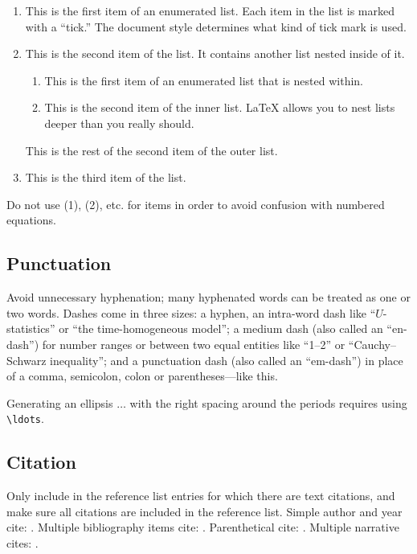 \documentclass[qe,nameyear,final,supplement,openaccess]{econsocart}
\theoremstyle{plain}
\begin{document}
\begin{enumerate}
\item This is the first item of an enumerated list. Each item in the list is marked with a ``tick.'' The document style determines what kind of tick mark is used.
\item This is the second item of the list. It contains another list nested inside of it.

\begin{enumerate}
\item This is the first item of an enumerated list that is nested within.
\item This is the second item of the inner list. LaTeX allows you to nest lists deeper than you really should.
\end{enumerate}

This is the rest of the second item of the outer list.


\item This is the third item of the list.
\end{enumerate}

Do not use (1), (2), etc.  for items in order to avoid confusion with numbered equations.

\subsection{Punctuation}

Avoid unnecessary hyphenation; many hyphenated words can be treated as one or two words.
Dashes come in three sizes: a hyphen, an intra-word dash like ``$U$-statistics'' or ``the time-homogeneous model'';
a medium dash (also called an ``en-dash'') for number ranges or between two equal entities like ``1--2'' or ``Cauchy--Schwarz inequality'';
and a punctuation dash (also called an ``em-dash'') in place of a comma, semicolon,
colon or parentheses---like this.

Generating an ellipsis $\ldots$ with the right spacing
around the periods requires using \texttt{{\textbackslash}ldots}.

\subsection{Citation}

Only include in the reference list entries for which there are text citations,
and make sure all citations are included in the reference list.
Simple author and year cite: \citet{b1}.
Multiple bibliography items cite: \citet{b2, b3, b4, b5}.
Parenthetical cite: \citep{b1}.
Multiple narrative cites: \citet{b2, b3, b4}.
\end{document}
